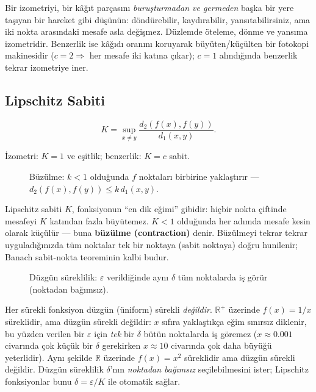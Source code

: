 \begin{sezgi}
Bir izometriyi, bir kâğıt parçasını \emph{buruşturmadan ve germeden} başka bir
yere taşıyan bir hareket gibi düşünün: döndürebilir, kaydırabilir,
yansıtabilirsiniz, ama iki nokta arasındaki mesafe asla değişmez. Düzlemde
öteleme, dönme ve yansıma izometridir. Benzerlik ise kâğıdı oranını koruyarak
büyüten/küçülten bir fotokopi makinesidir ($c=2 \Rightarrow$ her mesafe iki
katına çıkar); $c=1$ alındığında benzerlik tekrar izometriye iner.
\end{sezgi}

\subsection{Lipschitz Sabiti}

\[
K = \sup_{x \neq y} \frac{d_2(f(x),f(y))}{d_1(x,y)}.
\]

İzometri: $K=1$ ve eşitlik; benzerlik: $K=c$ sabit.

\begin{figure}[ht]
\centering

\caption{Büzülme: $k<1$ olduğunda $f$ noktaları birbirine yaklaştırır ---
         $d_2(f(x),f(y)) \le k\,d_1(x,y)$.}
\end{figure}

\begin{sezgi}
Lipschitz sabiti $K$, fonksiyonun ``en dik eğimi'' gibidir: hiçbir nokta
çiftinde mesafeyi $K$ katından fazla büyütemez. $K<1$ olduğunda her adımda mesafe
kesin olarak küçülür --- buna \textbf{büzülme (contraction)} denir. Büzülmeyi
tekrar tekrar uyguladığınızda tüm noktalar tek bir noktaya (sabit noktaya) doğru
hunilenir; Banach sabit-nokta teoreminin kalbi budur.
\end{sezgi}

\begin{figure}[ht]
\centering

\caption{Düzgün süreklilik: $\varepsilon$ verildiğinde aynı $\delta$ tüm
         noktalarda iş görür (noktadan bağımsız).}
\end{figure}

\begin{karsiornek}
Her sürekli fonksiyon düzgün (üniform) sürekli \emph{değildir}. $\mathbb{R}^+$
üzerinde $f(x) = 1/x$ süreklidir, ama düzgün sürekli değildir: $x$ sıfıra
yaklaştıkça eğim sınırsız diklenir, bu yüzden verilen bir $\varepsilon$ için
\emph{tek} bir $\delta$ bütün noktalarda iş göremez ($x \approx 0.001$ civarında
çok küçük bir $\delta$ gerekirken $x \approx 10$ civarında çok daha büyüğü
yeterlidir). Aynı şekilde $\mathbb{R}$ üzerinde $f(x)=x^2$ süreklidir ama düzgün
sürekli değildir. Düzgün süreklilik $\delta$'nın \emph{noktadan bağımsız}
seçilebilmesini ister; Lipschitz fonksiyonlar bunu $\delta=\varepsilon/K$ ile
otomatik sağlar.
\end{karsiornek}

